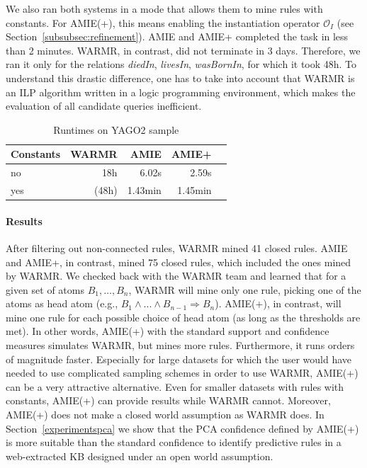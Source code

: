 We also ran both systems in a mode that allows them to mine rules with constants.
For AMIE(+), this means enabling the instantiation operator $\mathcal{O}_I$ (see Section~\ref{subsubsec:refinement}).
AMIE and AMIE+ completed the task in less than 2 minutes. WARMR, in contrast, did not terminate in 3 days.
Therefore, we ran it only for the relations \textit{diedIn}, \textit{livesIn}, \textit{wasBornIn}, for which it took 48h.
To understand this drastic difference, one has to take into account that WARMR is an ILP algorithm written in a logic programming environment,
which makes the evaluation of all candidate queries inefficient.

\begin{table}
\begin{tabular}{l|rr rr|}
Constants 	& WARMR 		& AMIE 		& AMIE+\\
\hline
 no 		& 18h 			& 6.02s 	& 2.59s \\
 yes 		& (48h) 	 	& 1.43min  	& 1.45min\\
\end{tabular}
\caption{Runtimes on YAGO2 sample}
\label{warmrruntime}
\end{table}


\paragraph{Results} After filtering out non-connected rules, WARMR mined 41 closed rules.
AMIE and AMIE+, in contrast, mined 75 closed rules, which included the ones mined by WARMR.
We checked back with the WARMR team and learned that for a given set of atoms $B_1,\dots, B_n$,
WARMR will mine only one rule,
picking one of the atoms as head atom (e.g., $B_1 \wedge ... \wedge B_{n-1} \Rightarrow B_n$).
AMIE(+), in contrast, will mine one rule for each possible choice of head atom (as long as the thresholds are met).
In other words, AMIE(+) with the standard support and confidence measures simulates WARMR, but mines more rules.
Furthermore, it runs orders of magnitude faster.
Especially for large datasets for which the user would have needed to use complicated sampling schemes in order to use WARMR,
AMIE(+) can be a very attractive alternative.
Even for smaller datasets with rules with constants, AMIE(+) can provide results while WARMR cannot.
Moreover, AMIE(+) does not make a closed world assumption as WARMR does.
In Section~\ref{experimentspca} we show that the PCA confidence defined by AMIE(+)
is more suitable than the standard confidence to identify predictive rules in a web-extracted KB designed under
an open world assumption.

